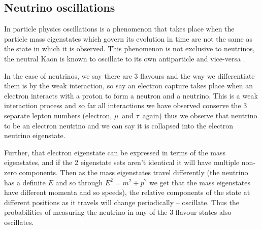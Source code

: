 \documentclass[a4paper,12pt]{article}
\newcommand{\Mu}{$\mu$}
\newcommand{\Tau}{$\tau$}
\begin{document}
\subsection{Neutrino oscillations}
In particle physics oscillations is a phenomenon that takes place when the particle mass eigenstates which govern its evolution in time are not the same as the state in which it is observed.
This phenomenon is not exclusive to neutrinos, the neutral Kaon is known to oscillate to its own antiparticle and vice-versa \cite{burkhardtWavelengthNeutrinoNeutral2003}.

In the case of neutrinos, we say there are 3 flavours and the way we differentiate them is by the weak interaction, so say an electron capture takes place when an electron interacts with a proton to form a neutron and a neutrino.
This is a weak interaction process and so far all interactions we have observed conserve the 3 separate lepton numbers (electron, \Mu\ and \Tau\ again) thus we observe that neutrino to be an electron neutrino and we can say it is collapsed into the electron neutrino eigenstate.

Further, that electron eigenstate can be expressed in terms of the mass eigenstates, and if the 2 eigenstate sets aren't identical it will have multiple non-zero components.
Then as the mass eigenstates travel differently (the neutrino has a definite $E$ and so through $E^2 = m^2 + p^2$ we get that the mass eigenstates have different momenta and so speeds), the relative components of the state at different positions as it travels will change periodically -- oscillate.
Thus the probabilities of measuring the neutrino in any of the 3 flavour states also oscillates.
\end{document}
